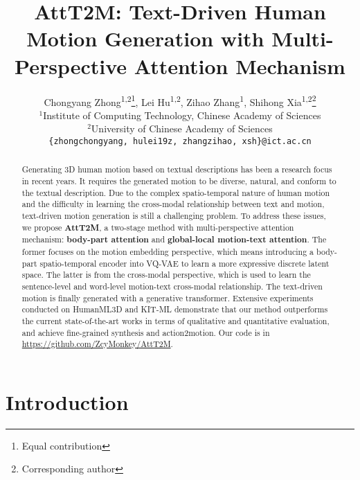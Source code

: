 \documentclass[10pt,twocolumn,letterpaper]{article}
\begin{document}
\title{AttT2M: Text-Driven Human Motion Generation with Multi-Perspective Attention Mechanism}

\author{Chongyang Zhong\textsuperscript{1,2}\thanks{Equal contribution}, Lei Hu\textsuperscript{1,2}\footnotemark[1], Zihao Zhang\textsuperscript{1}\footnotemark[1], Shihong Xia\textsuperscript{1,2}\thanks{Corresponding author}\\ 
$^1$Institute of Computing Technology, Chinese Academy of Sciences\\
$^2$University of Chinese Academy of Sciences\\
{\tt\small \{zhongchongyang, hulei19z, zhangzihao, xsh\}@ict.ac.cn}
}

\maketitle
\ificcvfinal\thispagestyle{empty}\fi

\begin{abstract}
Generating 3D human motion based on textual descriptions has been a research focus in recent years. It requires the generated motion to be diverse, natural, and conform to the textual description. Due to the complex spatio-temporal nature of human motion and the difficulty in learning the cross-modal relationship between text and motion, text-driven motion generation is still a challenging problem. To address these issues, we propose \textbf{AttT2M}, a two-stage method with multi-perspective attention mechanism: \textbf{body-part attention} and \textbf{global-local motion-text attention}. The former focuses on the motion embedding perspective, which means introducing a body-part spatio-temporal encoder into VQ-VAE to learn a more expressive discrete latent space. The latter is from the cross-modal perspective, which is used to learn the sentence-level and word-level motion-text cross-modal relationship. The text-driven motion is finally generated with a generative transformer. Extensive experiments conducted on HumanML3D and KIT-ML demonstrate that our method outperforms the current state-of-the-art works in terms of qualitative and quantitative evaluation, and achieve fine-grained synthesis and action2motion. Our code is in \href{https://github.com/ZcyMonkey/AttT2M}{https://github.com/ZcyMonkey/AttT2M}.
\end{abstract}

\section{Introduction}
\label{sec:intro}
\end{document}
